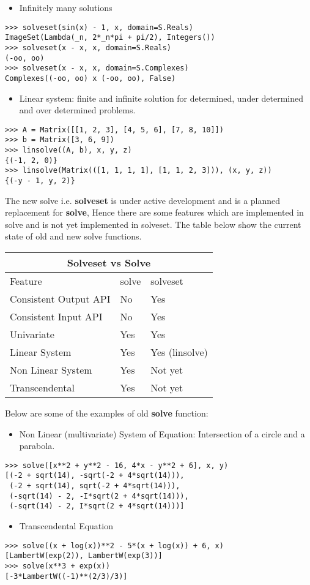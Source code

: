 \begin{itemize}
\item Infinitely many solutions
\end{itemize}
\begin{verbatim}
>>> solveset(sin(x) - 1, x, domain=S.Reals)
ImageSet(Lambda(_n, 2*_n*pi + pi/2), Integers())
>>> solveset(x - x, x, domain=S.Reals)
(-oo, oo)
>>> solveset(x - x, x, domain=S.Complexes)
Complexes((-oo, oo) x (-oo, oo), False)
\end{verbatim}

\begin{itemize}
\item Linear system: finite and infinite solution for determined, under
determined and over determined problems.
\end{itemize}
\begin{verbatim}
>>> A = Matrix([[1, 2, 3], [4, 5, 6], [7, 8, 10]])
>>> b = Matrix([3, 6, 9])
>>> linsolve((A, b), x, y, z)
{(-1, 2, 0)}
>>> linsolve(Matrix(([1, 1, 1, 1], [1, 1, 2, 3])), (x, y, z))
{(-y - 1, y, 2)}
\end{verbatim}

The new solve i.e. \textbf{solveset} is under active development and is a
planned replacement for \textbf{solve}, Hence there are some features which are
implemented in solve and is not yet implemented in solveset. The table below
show the current state of old and new solve functions.

\hfill

\begin{tabular}{ |p{4cm}|p{3cm}|p{3cm}|  }
\hline
\multicolumn{3}{|c|}{Solveset vs Solve} \\
\hline
Feature& solve &solveset \\
\hline
Consistent Output API & No & Yes \\
Consistent Input API & No & Yes \\
Univariate & Yes & Yes\\
Linear System& Yes & Yes (linsolve) \\
Non Linear System& Yes & Not yet \\
Transcendental& Yes & Not yet \\
\hline
\end{tabular}

\hfill \break{}

Below are some of the examples of old \textbf{solve} function:

\begin{itemize}
\item Non Linear (multivariate) System of Equation: Intersection of a circle
and a parabola.
\end{itemize}
\begin{verbatim}
>>> solve([x**2 + y**2 - 16, 4*x - y**2 + 6], x, y)
[(-2 + sqrt(14), -sqrt(-2 + 4*sqrt(14))),
 (-2 + sqrt(14), sqrt(-2 + 4*sqrt(14))),
 (-sqrt(14) - 2, -I*sqrt(2 + 4*sqrt(14))),
 (-sqrt(14) - 2, I*sqrt(2 + 4*sqrt(14)))]
\end{verbatim}

\begin{itemize}
\item Transcendental Equation
\end{itemize}
\begin{verbatim}
>>> solve((x + log(x))**2 - 5*(x + log(x)) + 6, x)
[LambertW(exp(2)), LambertW(exp(3))]
>>> solve(x**3 + exp(x))
[-3*LambertW((-1)**(2/3)/3)]
\end{verbatim}
